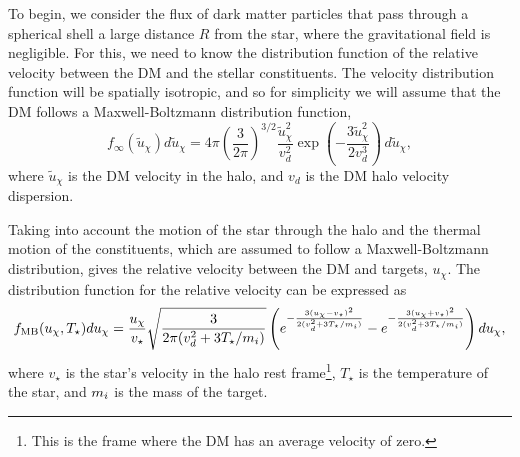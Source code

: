 To begin, we consider the flux of dark matter particles that pass through a spherical shell a large distance $R$ from the star, where the gravitational field is negligible. For this, we need to know the distribution function of the relative velocity between the DM and the stellar constituents. 
The velocity distribution function will be spatially isotropic, and so for simplicity we will assume that the DM follows a Maxwell-Boltzmann distribution function, 
\begin{equation}
    f_\infty(\tilde{u}_\chi) d\tilde{u}_\chi= 4 \pi \left( \frac{3}{2 \pi} \right)^{3/2}\frac{\tilde{u}_\chi^2}{v_d^2} \exp\left(-\frac{3 \tilde u_\chi^2}{2 v_d^3}\right)\,d\tilde u_\chi, 
\end{equation}
where $\tilde u_\chi$ is the DM velocity in the halo, and $v_d$ is the DM halo velocity dispersion.

Taking into account the motion of the star through the halo and the thermal motion of the constituents, which are assumed to follow a Maxwell-Boltzmann distribution, gives the relative velocity between the DM and targets, $ u_\chi$. 
The distribution function for the relative velocity can be expressed as~\cite{Busoni:2017mhe_oct_Evaporationscatteringmomentum}
\begin{equation}
    f_{\mathrm{MB}}(u_\chi, T_\star)du_\chi = \frac{u_\chi}{v_\star} \sqrt{\frac{3 }{2 \pi (v_d^2 + 3 T_\star /m_i)}} \left( e^{-\frac{3(u_\chi - v_\star)^2}{2(v_d^2 + 3 T_\star /m_i)}} - e^{-\frac{3(u_\chi + v_\star)^2}{2(v_d^2 + 3 T_\star /m_i)}} \right)du_\chi,
    \label{ch3:eq:MB_finit_T}
\end{equation}
where $v_\star$ is the star's velocity in the halo rest frame\footnote{This is the frame where the DM has an average velocity of zero.}, $T_\star$ is the temperature of the star, and $m_i$ is the mass of the target.

